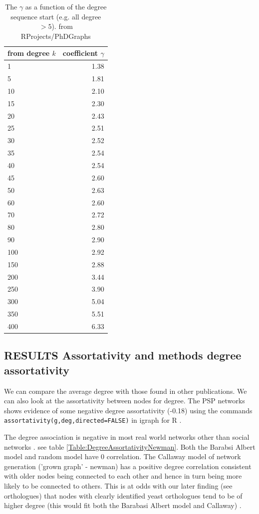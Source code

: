 \begin{table}[ht]
\centering
\begin{tabular}{lr}
  \hline
  from degree $k$ & coefficient $\gamma$ \\ 
  \hline
1 & 1.38 \\ 
  5 & 1.81 \\ 
  10 & 2.10 \\ 
  15 & 2.30 \\ 
  20 & 2.43 \\ 
  25 & 2.51 \\ 
   30 & 2.52 \\ 
  35 & 2.54 \\ 
   40 & 2.54 \\ 
   45 & 2.60 \\ 
  50 & 2.63 \\ 
   60 & 2.60 \\ 
   70 & 2.72 \\ 
   80 & 2.80 \\ 
   90 & 2.90 \\ 
   100 & 2.92 \\ 
  150 & 2.88 \\ 
   200 & 3.44 \\ 
   250 & 3.90 \\ 
  300 & 5.04 \\ 
   350 & 5.51 \\ 
   400 & 6.33 \\ 
   \hline
\end{tabular}
\caption{The $\gamma$ as a function of the degree sequence start (e.g. all degree $>5$). from RProjects/PhDGraphs}
  \label{table:gamma}
\end{table}

\subsection{RESULTS Assortativity and methods degree assortativity}
We can compare the average degree with those found in other publications. We can also look at the assortativity between nodes for degree. The PSP networks shows evidence of some negative degree assortativity (-0.18) using the commands \texttt{assortativity(g,deg,directed=FALSE)} in igraph for R .

The degree association is negative in most real world networks other than social networks \cite{newman2002assortative}.  see table \ref{Table:DegreeAssortativityNewman}. Both the Barabsi Albert model and random model have 0 correlation. The Callaway model of network generation ('grown graph' - newman) has a positive degree correlation consistent with older nodes being connected to each other and hence in turn being more likely to be connected to others. This is at odds with our later finding (see orthologues) that nodes with clearly identified yeast orthologues tend to be of higher degree (this would fit both the Barabasi Albert model and Callaway) . 

